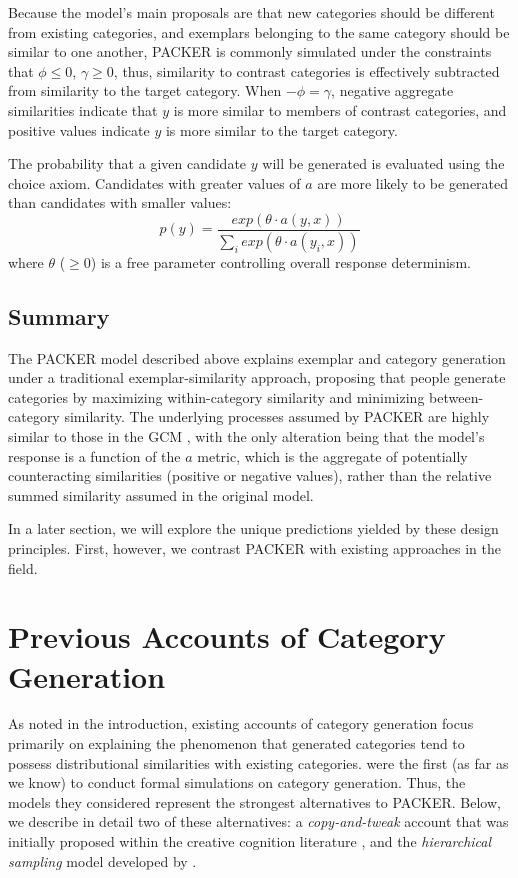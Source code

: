 \documentclass[10pt,letterpaper]{article}
\begin{document}
Because the model's main proposals are that new categories should be different from existing categories, and exemplars belonging to the same category should be similar to one another, PACKER is commonly simulated under the constraints that $\phi \leq 0$, $\gamma \geq 0$, thus, similarity to contrast categories is effectively subtracted from similarity to the target category. When $-\phi = \gamma$, negative aggregate similarities indicate that $y$ is more similar to members of contrast categories, and positive values indicate $y$ is more similar to the target category.

The probability that a given candidate $y$ will be generated is evaluated using the \citet{luce1977choice} choice axiom. Candidates with greater values of $a$ are more likely to be generated than candidates with smaller values:
\begin{equation}
p(y) = \dfrac
    { exp( { \theta \cdot a(y, x) } ) }
    { \sum_i{ exp( { \theta \cdot a(y_i, x) } ) } }
    \label{eq:packer-choice}
\end{equation}
where $\theta$ ($\geq 0$) is a free parameter controlling overall response determinism. 

\subsection{Summary}

The PACKER model described above explains exemplar and category generation under a traditional exemplar-similarity approach, proposing that people generate categories by maximizing within-category similarity and minimizing between-category similarity. The underlying processes assumed by PACKER are highly similar to those in the GCM \citep{nosofsky1984choice}, with the only alteration being that the model's response is a function of the $a$ metric, which is the aggregate of potentially counteracting similarities (positive or negative values), rather than the relative summed similarity assumed in the original model.

In a later section, we will explore the unique predictions yielded by these design principles. First, however, we contrast PACKER with existing approaches in the field. 


\section{Previous Accounts of Category Generation}

As noted in the introduction, existing accounts of category generation focus primarily on explaining the phenomenon that generated categories tend to possess distributional similarities with existing categories. \citet{jern2013probabilistic} were the first (as far as we know) to conduct formal simulations on category generation. Thus, the models they considered represent the strongest alternatives to PACKER. Below, we describe in detail two of these alternatives: a \textit{copy-and-tweak} account that was initially proposed within the creative cognition literature \citep{ward2002role,ward1995s}, and the \textit{hierarchical sampling} model developed by \citet{jern2013probabilistic}.
\end{document}
